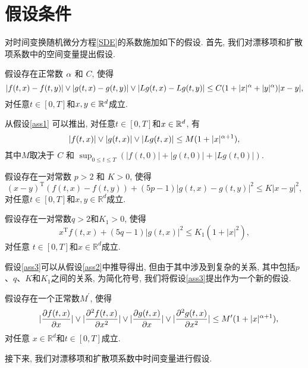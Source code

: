 \section{假设条件}
对时间变换随机微分方程\eqref{SDE}的系数施加如下的假设. 首先, 我们对漂移项和扩散项系数中的空间变量提出假设.
\begin{assumption}
    \label{ass1}
    假设存在正常数 $\alpha$ 和 $C$, 使得
    \begin{equation*}
        |f(t,x)-f(t,y)|\vee |g(t,x)-g(t,y)|\vee |Lg(t,x)-Lg(t,y)|\leq C(1+|x|^{\alpha}+|y|^{\alpha})|x-y|,
    \end{equation*}
    对任意$t\in[0,T]$和$x,y \in \mathbb{R}^d$成立.

    从假设\ref{ass1} 可以推出, 对任意$t\in [0,T]$和$x\in \mathbb{R}^d$, 有
    \begin{equation}
        \label{equ2-2}
        |f(t,x)|\vee|g(t,x)|\vee|Lg(t,x)|\leq M(1+|x|^{\alpha+1}),
    \end{equation}
   其中$M$取决于 $C$ 和 $\sup_{0\leq t\leq T}\left(|f(t,0)|+|g(t,0)|+|Lg(t,0)|\right)$.
\end{assumption}
\par
\begin{assumption}
    \label{ass2}
    假设存在一对常数 $p>2$ 和 $K>0$, 使得
    \begin{equation*}
        (x-y)^{\mathrm{T}}(f(t,x)-f(t,y)) +(5p-1)|g(t,x)-g(t,y)|^2\leq K|x-y|^2,
    \end{equation*}
    对任意$t\in [0,T]$和$x,y \in \mathbb{R}^d$成立.
\end{assumption}
\begin{assumption}
    \label{ass3}
    假设存在一对常数$q>2$和$K_1>0$, 使得
    \begin{equation*}
        x^{\mathrm{T}}f(t,x) +(5q-1)|g(t,x)|^2\leq K_1(1+|x|^2),
    \end{equation*}
    对任意 $t\in [0,T]$和$x \in \mathbb{R}^d$成立.
\end{assumption}
假设\eqref{ass3}可以从假设\eqref{ass2}中推导得出, 但由于其中涉及到复杂的关系, 其中包括$p$、$q$、$K$和$K_1$之间的关系, 为简化符号, 我们将假设\eqref{ass3}提出作为一个新的假设.
\begin{assumption}
    \label{ass5}
    假设存在一个正常数$ M^{\prime}$, 使得
    \begin{eqnarray*}
        &&|\frac{\partial f(t,x)}{\partial x}|\vee|\frac{\partial^{2} f(t,x)}{\partial x^{2}}|\vee|\frac{\partial g(t,x)}{\partial x}|\vee|\frac{\partial^{2} g(t,x)}{\partial x^{2}}|\leq M^{\prime}(1+|x|^{\alpha+1}),
    \end{eqnarray*}
    对任意 $x\in \mathbb{R}^d$和$t\in [0,T]$成立.
        
接下来, 我们对漂移项和扩散项系数中时间变量进行假设.
\end{assumption}
